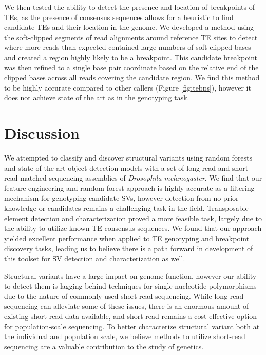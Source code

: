 We then tested the ability to detect the presence and location of breakpoints of TEs, as the presence of consensus sequences allows for a heuristic to find candidate TEs and their location in the genome. We developed a method using the soft-clipped segments of read alignments around reference TE sites to detect where more reads than expected contained large numbers of soft-clipped bases and created a region highly likely to be a breakpoint. This candidate breakpoint was then refined to a single base pair coordinate based on the relative end of the clipped bases across all reads covering the candidate region. We find this method to be highly accurate compared to other callers (Figure \ref{fig:tebps}), however it does not achieve state of the art as in the genotyping task.

\section{Discussion}

We attempted to classify and discover structural variants using random forests and state of the art object detection models with a set of long-read and short-read matched sequencing assemblies of \textit{Drosophila melanogaster}. We find that our feature engineering and random forest approach is highly accurate as a filtering mechanism for genotyping candidate SVs, however detection from no prior knowledge or candidates remains a challenging task in the field. Transposable element detection and characterization proved a more feasible task, largely due to the ability to utilize known TE consensus sequences. We found that our approach yielded excellent performance when applied to TE genotyping and breakpoint discovery tasks, leading us to believe there is a path forward in development of this toolset for SV detection and characterization as well.

Structural variants have a large impact on genome function, however our ability to detect them is lagging behind techniques for single nucleotide polymorphisms due to the nature of commonly used short-read sequencing. While long-read sequencing can alleviate some of these issues, there is an enormous amount of existing short-read data available, and short-read remains a cost-effective option for population-scale sequencing. To better characterize structural variant both at the individual and population scale, we believe methods to utilize short-read sequencing are a valuable contribution to the study of genetics.

